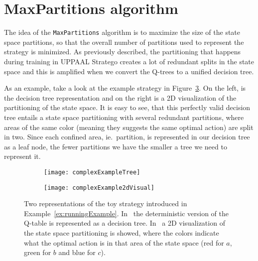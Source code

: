 \section{MaxPartitions algorithm}%
\label{sec:maxParts}

The idea of the \texttt{MaxPartitions} algorithm is to maximize the size of the
state space partitions, so that the overall number of partitions used to
represent the strategy is minimized. As previously described, the partitioning
that happens during training in UPPAAL Stratego creates a lot of redundant
splits in the state space and this is amplified when we convert the Q-trees to a
unified decision tree.

As an example, take a look at the example strategy in
Figure~\ref{fig:complexExample}. On the left, is the decision tree
representation and on the right is a 2D visualization of the partitioning of the
state space. It is easy to see, that this perfectly valid decision tree entails
a state space partitioning with several redundant partitions, where areas of the
same color (meaning they suggests the same optimal action) are split in two.
Since each confined area, ie.\ partition, is represented in our decision tree as
a leaf node, the fewer partitions we have the smaller a tree we need to
represent it.

\begin{figure}[ht]
    \begin{subfigure}[b]{.5\textwidth}
        \centering
        \texttt{[image: complexExampleTree]}
        \subcaption{%
        }\label{fig:complexExampleTree}
    \end{subfigure}
    \begin{subfigure}[b]{.5\textwidth}
        \centering
        \texttt{[image: complexExample2dVisual]}
        \subcaption{%
        }\label{fig:complexExample2dVisual}
    \end{subfigure}%

    \caption{%
        Two representations of the toy strategy introduced in
        Example~\ref{ex:runningExample}.  In~ the
        deterministic version of the Q-table is represented as a decision tree.
        In~ a 2D visualization of the state
        space partitioning is showed, where the colors indicate what the optimal
        action is in that area of the state space (red for $a$, green for $b$
        and blue for $c$).
    }%
    \label{fig:complexExample}
\end{figure}

